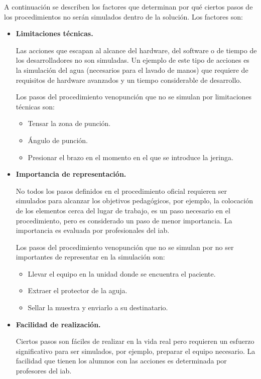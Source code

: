 A continuación se describen los factores que determinan por qué ciertos pasos
de los procedimientos no serán simulados dentro de la solución. Los factores son:


\begin{itemize}
\item  \textbf{Limitaciones técnicas.} 
    
    Las acciones que escapan al alcance del hardware, del software o de tiempo
    de los desarrolladores no son simuladas. Un ejemplo de este tipo de acciones
    es la simulación del agua (necesarios para el lavado de manos) que requiere
    de requisitos de hardware avanzados y un tiempo considerable de desarrollo.
        
    Los pasos del procedimiento venopunción que no se simulan por
    limitaciones técnicas son:
    \begin{itemize}
        \item Tensar la zona de punción.
        \item Ángulo de punción.
        \item Presionar el brazo en el momento en el que se introduce la jeringa.
    \end{itemize}
    
    
\item \textbf{Importancia de representación.}

    No todos los pasos definidos en el procedimiento oficial requieren ser
    simulados para alcanzar los objetivos pedagógicos, por ejemplo, la colocación 
    de los elementos cerca del lugar de
    trabajo, es un paso necesario en el procedimiento, pero es considerado un
    paso de menor importancia. La importancia es evaluada por profesionales del \Gls{iab}.
    
    Los pasos del procedimiento venopunción que no se simulan por 
    no ser importantes de representar en la simulación son:
    \begin{itemize}
        \item Llevar el equipo en la unidad donde se encuentra el paciente.
        \item Extraer el protector de la aguja.
        \item Sellar la muestra y enviarlo a su destinatario.
    \end{itemize}
    
    
\item \textbf{Facilidad de realización.}

    Ciertos pasos son fáciles de realizar en la vida real pero requieren un
    esfuerzo significativo para ser simulados, por ejemplo, preparar el
    equipo necesario. La facilidad que tienen los alumnos con las acciones es 
    determinada por profesores del \Gls{iab}.
    

\end{itemize}
